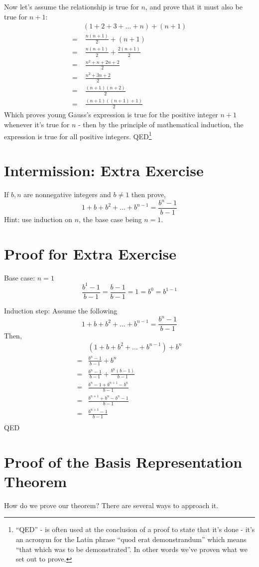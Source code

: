 \documentclass{article}
\begin{document}
Now let's assume the relationship is true for $n$,
and prove that it must also be true for $n+1$:
\begin{align*}
&(1+2+3+\ldots+n) + (n+1)\\
= & \; \frac{n(n+1)}{2} + (n+1)\\
= & \; \frac{n(n+1)}{2} + \frac{2(n+1)}{2}\\
= & \; \frac{n^2+n+2n+2}{2}\\
= & \; \frac{n^2+3n+2}{2}\\
= & \; \frac{(n+1)(n+2)}{2}\\
= & \; \frac{(n+1)((n+1)+1)}{2}
\end{align*}
Which proves young Gauss's expression is true for
the positive integer $n+1$ whenever it's true for $n$ - then
by the principle of mathematical induction,
the expression is true for all positive integers. QED\footnote{``QED'' - is
often used at the conclusion of a proof to state that it's
done - it's an acronym for the Latin phrase
``quod erat demonstrandum'' which means ``that which was to be demonstrated''.
In other words we've proven what we set out to prove.}

\section*{Intermission: Extra Exercise}
If $b, n$ are nonnegative integers and $b\ne1$ then prove,
\[1+b+b^2+\dots+b^{n-1} = \frac{b^n-1}{b-1}\]
Hint: use induction on $n$, the base case being $n=1$.

\section*{Proof for Extra Exercise}
Base case: $n=1$
\[\frac{b^1-1}{b-1}=\frac{b-1}{b-1}=1=b^0=b^{1-1}\]

Induction step:
Assume the following
\[1+b+b^2+\dots+b^{n-1} = \frac{b^n-1}{b-1}\]
Then,
\begin{align*}
&(1+b+b^2+\dots+b^{n-1}) + b^n\\
= &\frac{b^n-1}{b-1}+b^n\\
= &\frac{b^n-1}{b-1}+\frac{b^n(b-1)}{b-1}\\
= &\frac{b^n-1+b^{n+1}-b^n}{b-1}\\
= &\frac{b^{n+1}+b^n-b^n-1}{b-1}\\
= &\frac{b^{n+1}-1}{b-1}\\
\end{align*}
QED
\section*{Proof of the  Basis Representation Theorem}
How do we prove our theorem? There are several ways to approach it.
\end{document}
